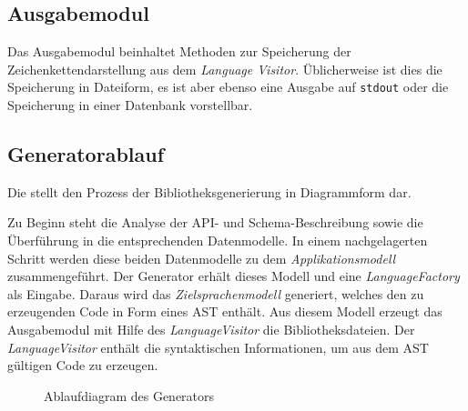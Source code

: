 \subsection{Ausgabemodul}
\label{sec:printer_module}

Das Ausgabemodul beinhaltet Methoden zur Speicherung der Zeichenkettendarstellung aus dem \emph{Language Visitor}. Üblicherweise ist dies die Speicherung in Dateiform, es ist aber ebenso eine Ausgabe auf \texttt{stdout} oder die Speicherung in einer Datenbank vorstellbar.

\subsection{Generatorablauf}
\label{sec:generation_process}

Die  stellt den Prozess der Bibliotheksgenerierung in Diagrammform dar.

Zu Beginn steht die Analyse der \gls{API}- und Schema-Beschreibung sowie die Überführung in die entsprechenden Datenmodelle. In einem nachgelagerten Schritt werden diese beiden Datenmodelle zu dem \emph{Applikationsmodell} zusammengeführt. Der Generator erhält dieses Modell und eine \emph{LanguageFactory} als Eingabe. Daraus wird das \emph{Zielsprachenmodell} generiert, welches den zu erzeugenden Code in Form eines \gls{AST} enthält. Aus diesem Modell erzeugt das Ausgabemodul mit Hilfe des \emph{LanguageVisitor} die Bibliotheksdateien. Der \emph{LanguageVisitor} enthält die syntaktischen Informationen, um aus dem \gls{AST} gültigen Code zu erzeugen.

\begin{sidewaysfigure}
    \centering
    \resizebox{ \textwidth}{!}{
        
    } 
    \caption{Ablaufdiagram des Generators}
    \label{fig:generation_process}
\end{sidewaysfigure}